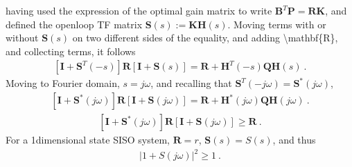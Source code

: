 \documentclass[letterpaper,10pt,english]{jupyterBook}
\begin{document}
\sphinxAtStartPar
having used the expression of the optimal gain matrix to write \(\mathbf{B}^T \mathbf{P} = \mathbf{R} \mathbf{K}\), and defined the open\sphinxhyphen{}loop  TF matrix \(\mathbf{S}(s) := \mathbf{K} \mathbf{H}(s)\). Moving terms with or without \(\mathbf{S}(s)\) on two different sides of the equality, and adding \textbackslash{}mathbf\{R\}, and collecting terms, it follows
\begin{equation*}
\begin{split}\left[ \mathbf{I} + \mathbf{S}^T(-s) \right] \mathbf{R} \left[ \mathbf{I} + \mathbf{S}(s) \right] = \mathbf{R} + \mathbf{H}^{T}(-s) \mathbf{Q} \mathbf{H}(s) \ .\end{split}
\end{equation*}
\sphinxAtStartPar
Moving to Fourier domain, \(s = j \omega\), and recalling that \(\mathbf{S}^T(-j\omega) = \mathbf{S}^*( j \omega ) \),
\begin{equation*}
\begin{split}\left[ \mathbf{I} + \mathbf{S}^*(j \omega) \right] \mathbf{R} \left[ \mathbf{I} + \mathbf{S}(j \omega) \right] = \mathbf{R} + \mathbf{H}^*(j\omega) \mathbf{Q} \mathbf{H}(j\omega) \ .\end{split}
\end{equation*}
\sphinxAtStartPar
{} 
\begin{equation*}
\begin{split}\left[ \mathbf{I} + \mathbf{S}^*(j \omega) \right] \mathbf{R} \left[ \mathbf{I} + \mathbf{S}(j \omega) \right] \ge \mathbf{R} \ .\end{split}
\end{equation*}
\sphinxAtStartPar
For a 1\sphinxhyphen{}dimensional state SISO system, \(\mathbf{R} = r\), \(\mathbf{S}(s) = S(s)\), and thus
\begin{equation*}
\begin{split}\left| 1 + S(j\omega) \right|^2 \ge 1 \ .\end{split}
\end{equation*}
\end{document}
